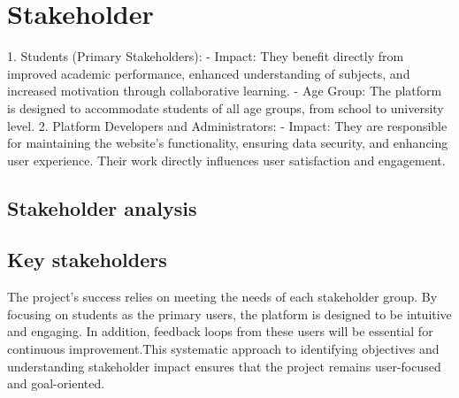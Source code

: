 \section{Stakeholder}
\label{sect:stakeholder}
\begin{length}
    1. Students (Primary Stakeholders):  
   - Impact: They benefit directly from improved academic performance, enhanced understanding of subjects, and increased motivation through collaborative learning.  
   - Age Group: The platform is designed to accommodate students of all age groups, from school to university level.
    2. Platform Developers and Administrators: 
   - Impact: They are responsible for maintaining the website's functionality, ensuring data security, and enhancing user experience. Their work directly influences user satisfaction and engagement.  

\end{length}

\subsection{Stakeholder analysis}
\subsection{Key stakeholders}
\begin{length}
    The project's success relies on meeting the needs of each stakeholder group. By focusing on students as the primary users, the platform is designed to be intuitive and engaging. In addition, feedback loops from these users will be essential for continuous improvement.This systematic approach to identifying objectives and understanding stakeholder impact ensures that the project remains user-focused and goal-oriented.
\end{length}